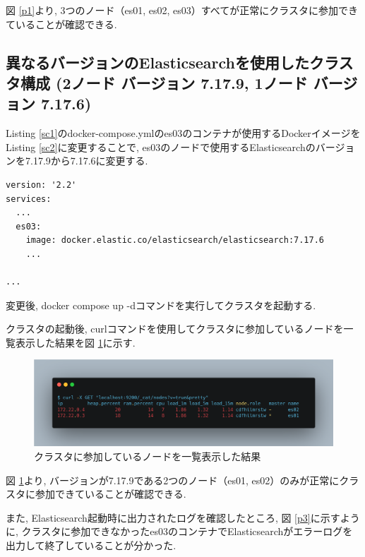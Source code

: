 \documentclass[a4j,12pt,]{jarticle}
\begin{document}
図 \ref{p1}より, 3つのノード（es01, es02, es03）すべてが正常にクラスタに参加できていることが確認できる.

\subsection{異なるバージョンのElasticsearchを使用したクラスタ構成 (2ノード バージョン 7.17.9, 1ノード バージョン 7.17.6)}

Listing \ref{sc1}のdocker-compose.ymlのes03のコンテナが使用するDockerイメージをListing \ref{sc2}に変更することで, es03のノードで使用するElasticsearchのバージョンを7.17.9から7.17.6に変更する.

\begin{lstlisting}[caption=Listing \ref{sc1}のdocker-compose.ymlから変更を加えた箇所, label=sc2]
version: '2.2'
services:
  ...
  es03:
    image: docker.elastic.co/elasticsearch/elasticsearch:7.17.6
    ...

...
\end{lstlisting}

変更後, docker compose up -dコマンドを実行してクラスタを起動する.

クラスタの起動後, curlコマンドを使用してクラスタに参加しているノードを一覧表示した結果を図 \ref{p2}に示す.

\begin{figure}[H]
  \begin{center}
    \includegraphics[width=160mm]{curl-different.png}
    \caption{クラスタに参加しているノードを一覧表示した結果}
    \label{p2}
  \end{center}
\end{figure}

図 \ref{p2}より, バージョンが7.17.9である2つのノード（es01, es02）のみが正常にクラスタに参加できていることが確認できる.

また, Elasticsearch起動時に出力されたログを確認したところ, 図 \ref{p3}に示すように, クラスタに参加できなかったes03のコンテナでElasticsearchがエラーログを出力して終了していることが分かった.
\end{document}
